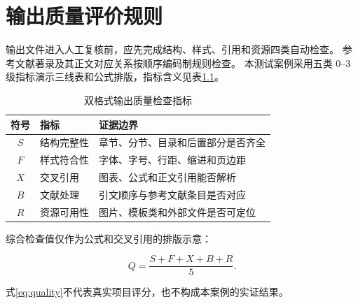 \chapter{输出质量评价规则}

输出文件进入人工复核前，应先完成结构、样式、引用和资源四类自动检查。
参考文献著录及其正文对应关系按顺序编码制规则检查。
本测试案例采用五类 $0$--$3$ 级指标演示三线表和公式排版，指标含义见表\ref{tab:indicators}。

\begin{table}[htbp]
  \centering
  \caption{双格式输出质量检查指标}
  \label{tab:indicators}
  \begin{tabularx}{\textwidth}{cX X}
    \toprule
    符号 & 指标 & 证据边界 \\
    \midrule
    $S$ & 结构完整性 & 章节、分节、目录和后置部分是否齐全 \\
    $F$ & 样式符合性 & 字体、字号、行距、缩进和页边距 \\
    $X$ & 交叉引用 & 图表、公式和正文引用能否解析 \\
    $B$ & 文献处理 & 引文顺序与参考文献条目是否对应 \\
    $R$ & 资源可用性 & 图片、模板类和外部文件是否可定位 \\
    \bottomrule
  \end{tabularx}
\end{table}

综合检查值仅作为公式和交叉引用的排版示意：

\begin{equation}
  Q=\frac{S+F+X+B+R}{5}.
  \label{eq:quality}
\end{equation}

式\eqref{eq:quality}不代表真实项目评分，也不构成本案例的实证结果。
